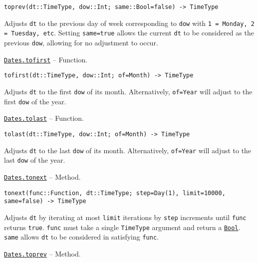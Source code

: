 \begin{adjustwidth}{2em}{0pt}


\begin{verbatim}
toprev(dt::TimeType, dow::Int; same::Bool=false) -> TimeType
\end{verbatim}

Adjusts \texttt{dt} to the previous day of week corresponding to \texttt{dow} with \texttt{1 = Monday, 2 = Tuesday, etc}. Setting \texttt{same=true} allows the current \texttt{dt} to be considered as the previous \texttt{dow}, allowing for no adjustment to occur.



\end{adjustwidth}
\hypertarget{14392816409484181570}{}
\hyperlink{14392816409484181570}{\texttt{Dates.tofirst}}  -- {Function.}

\begin{adjustwidth}{2em}{0pt}


\begin{verbatim}
tofirst(dt::TimeType, dow::Int; of=Month) -> TimeType
\end{verbatim}

Adjusts \texttt{dt} to the first \texttt{dow} of its month. Alternatively, \texttt{of=Year} will adjust to the first \texttt{dow} of the year.



\end{adjustwidth}
\hypertarget{18080067486232724602}{}
\hyperlink{18080067486232724602}{\texttt{Dates.tolast}}  -- {Function.}

\begin{adjustwidth}{2em}{0pt}


\begin{verbatim}
tolast(dt::TimeType, dow::Int; of=Month) -> TimeType
\end{verbatim}

Adjusts \texttt{dt} to the last \texttt{dow} of its month. Alternatively, \texttt{of=Year} will adjust to the last \texttt{dow} of the year.



\end{adjustwidth}
\hypertarget{595098118024490396}{}
\hyperlink{595098118024490396}{\texttt{Dates.tonext}}  -- {Method.}

\begin{adjustwidth}{2em}{0pt}


\begin{verbatim}
tonext(func::Function, dt::TimeType; step=Day(1), limit=10000, same=false) -> TimeType
\end{verbatim}

Adjusts \texttt{dt} by iterating at most \texttt{limit} iterations by \texttt{step} increments until \texttt{func} returns \texttt{true}. \texttt{func} must take a single \texttt{TimeType} argument and return a \hyperlink{46725311238864537}{\texttt{Bool}}. \texttt{same} allows \texttt{dt} to be considered in satisfying \texttt{func}.



\end{adjustwidth}
\hypertarget{11721832093096787264}{}
\hyperlink{11721832093096787264}{\texttt{Dates.toprev}}  -- {Method.}

